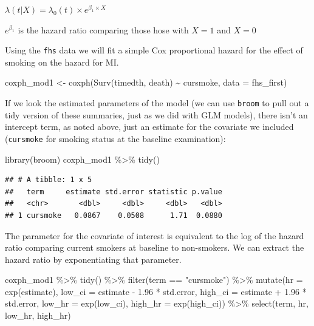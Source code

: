 \documentclass[
]{book}
\newenvironment{Shaded}{\begin{snugshade}}{\end{snugshade}}
\newcommand{\AttributeTok}[1]{\textcolor[rgb]{0.77,0.63,0.00}{#1}}
\newcommand{\FloatTok}[1]{\textcolor[rgb]{0.00,0.00,0.81}{#1}}
\newcommand{\FunctionTok}[1]{\textcolor[rgb]{0.00,0.00,0.00}{#1}}
\newcommand{\NormalTok}[1]{#1}
\newcommand{\OtherTok}[1]{\textcolor[rgb]{0.56,0.35,0.01}{#1}}
\newcommand{\SpecialCharTok}[1]{\textcolor[rgb]{0.00,0.00,0.00}{#1}}
\newcommand{\StringTok}[1]{\textcolor[rgb]{0.31,0.60,0.02}{#1}}
\begin{document}
\(\lambda(t|X)=\lambda_{0}(t)\times e^{\beta_{1}\times X}\)

\(e^{\beta_{1}}\) is the hazard ratio comparing those hose with \(X=1\) and \(X=0\)

Using the \texttt{fhs} data we will fit a simple Cox proportional hazard for the effect of smoking on the hazard for MI.

\begin{Shaded}
\begin{Highlighting}[]
\NormalTok{coxph\_mod1 }\OtherTok{\textless{}{-}} \FunctionTok{coxph}\NormalTok{(}\FunctionTok{Surv}\NormalTok{(timedth, death) }\SpecialCharTok{\textasciitilde{}}\NormalTok{ cursmoke, }\AttributeTok{data =}\NormalTok{ fhs\_first)}
\end{Highlighting}
\end{Shaded}

If we look the estimated parameters of the model (we can use \texttt{broom} to pull out a tidy version of these summaries, just as we did with GLM models), there isn't an intercept term, as noted above, just an estimate for the covariate we included (\texttt{cursmoke} for smoking status at the baseline examination):

\begin{Shaded}
\begin{Highlighting}[]
\FunctionTok{library}\NormalTok{(broom)}
\NormalTok{coxph\_mod1 }\SpecialCharTok{\%\textgreater{}\%}
  \FunctionTok{tidy}\NormalTok{()}
\end{Highlighting}
\end{Shaded}

\begin{verbatim}
## # A tibble: 1 x 5
##   term     estimate std.error statistic p.value
##   <chr>       <dbl>     <dbl>     <dbl>   <dbl>
## 1 cursmoke   0.0867    0.0508      1.71  0.0880
\end{verbatim}

The parameter for the covariate of interest is equivalent to the log of the hazard ratio comparing current smokers at baseline to non-smokers. We can extract the hazard ratio by exponentiating that parameter.

\begin{Shaded}
\begin{Highlighting}[]
\NormalTok{coxph\_mod1 }\SpecialCharTok{\%\textgreater{}\%} 
  \FunctionTok{tidy}\NormalTok{() }\SpecialCharTok{\%\textgreater{}\%} 
  \FunctionTok{filter}\NormalTok{(term }\SpecialCharTok{==} \StringTok{"cursmoke"}\NormalTok{) }\SpecialCharTok{\%\textgreater{}\%} 
  \FunctionTok{mutate}\NormalTok{(}\AttributeTok{hr =} \FunctionTok{exp}\NormalTok{(estimate),}
         \AttributeTok{low\_ci =}\NormalTok{ estimate }\SpecialCharTok{{-}} \FloatTok{1.96} \SpecialCharTok{*}\NormalTok{ std.error, }
         \AttributeTok{high\_ci =}\NormalTok{ estimate }\SpecialCharTok{+} \FloatTok{1.96} \SpecialCharTok{*}\NormalTok{ std.error, }
         \AttributeTok{low\_hr =} \FunctionTok{exp}\NormalTok{(low\_ci), }
         \AttributeTok{high\_hr =} \FunctionTok{exp}\NormalTok{(high\_ci)) }\SpecialCharTok{\%\textgreater{}\%} 
  \FunctionTok{select}\NormalTok{(term, hr, low\_hr, high\_hr)}
\end{Highlighting}
\end{Shaded}
\end{document}
